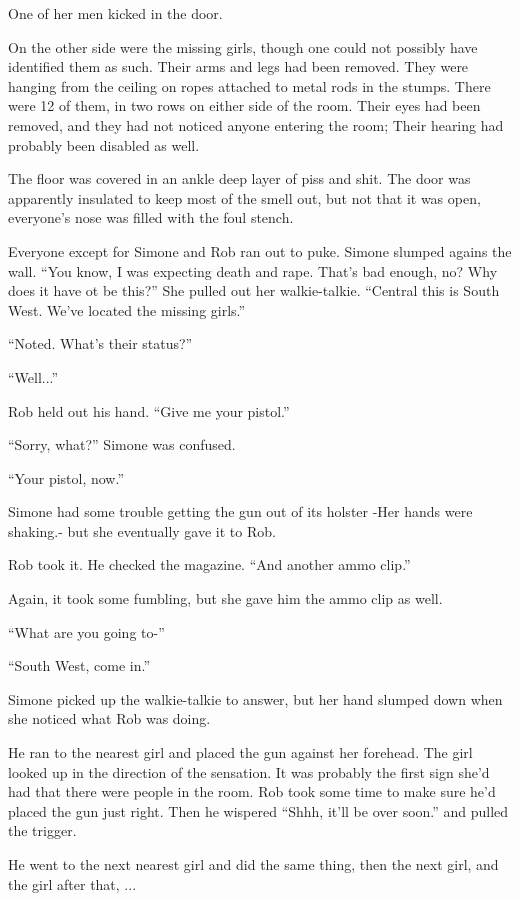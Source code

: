 \documentclass[letterpaper,12pt]{report}
\begin{document}
One of her men kicked in the door.

On the other side were the missing girls, though one could not possibly have identified them as such. Their arms and legs had been removed. They were hanging from the ceiling on ropes attached to metal rods in the stumps. There were 12 of them, in two rows on either side of the room. Their eyes had been removed, and they had not noticed anyone entering the room; Their hearing had probably been disabled as well.

The floor was covered in an ankle deep layer of piss and shit. The door was apparently insulated to keep most of the smell out, but not that it was open, everyone's nose was filled with the foul stench.

Everyone except for Simone and Rob ran out to puke. Simone slumped agains the wall. ``You know, I was expecting death and rape. That's bad enough, no? Why does it have ot be this?'' She pulled out her walkie-talkie. ``Central this is South West. We've located the missing girls.''

``Noted. What's their status?''

``Well...''

Rob held out his hand. ``Give me your pistol.''

``Sorry, what?'' Simone was confused.

``Your pistol, now.''

Simone had some trouble getting the gun out of its holster -Her hands were shaking.- but she eventually gave it to Rob.

Rob took it. He checked the magazine. ``And another ammo clip.''

Again, it took some fumbling, but she gave him the ammo clip as well.

``What are you going to-''

``South West, come in.''

Simone picked up the walkie-talkie to answer, but her hand slumped down when she noticed what Rob was doing.

He ran to the nearest girl and placed the gun against her forehead. The girl looked up in the direction of the sensation. It was probably the first sign she'd had that there were people in the room. Rob took some time to make sure he'd placed the gun just right. Then he wispered ``Shhh, it'll be over soon.'' and pulled the trigger.

He went to the next nearest girl and did the same thing, then the next girl, and the girl after that, ...
\end{document}
